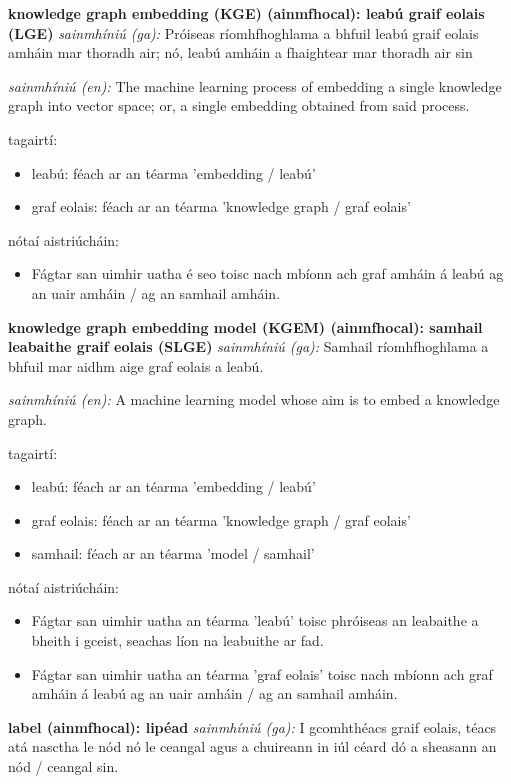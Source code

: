 \documentclass{article}
\begin{document}
\textbf{knowledge graph embedding (KGE) (ainmfhocal): leabú graif eolais (LGE)}
\textit{sainmhíniú (ga):} Próiseas ríomhfhoghlama a bhfuil leabú graif eolais amháin mar thoradh air; nó, leabú amháin a fhaightear mar thoradh air sin

\textit{sainmhíniú (en):} The machine learning process of embedding a single knowledge graph into vector space; or, a single embedding obtained from said process.

tagairtí:
\begin{itemize}
	\item leabú: féach ar an téarma 'embedding / leabú'
	\item graf eolais: féach ar an téarma 'knowledge graph / graf eolais'
\end{itemize}

nótaí aistriúcháin:
\begin{itemize}
	\item Fágtar san uimhir uatha é seo toisc nach mbíonn ach graf amháin á leabú ag an uair amháin / ag an samhail amháin.
\end{itemize}


\textbf{knowledge graph embedding model (KGEM) (ainmfhocal): samhail leabaithe graif eolais (SLGE)}
\textit{sainmhíniú (ga):} Samhail ríomhfhoghlama a bhfuil mar aidhm aige graf eolais a leabú.

\textit{sainmhíniú (en):} A machine learning model whose aim is to embed a knowledge graph.

tagairtí:
\begin{itemize}
	\item leabú: féach ar an téarma 'embedding / leabú'
	\item graf eolais: féach ar an téarma 'knowledge graph / graf eolais'
	\item samhail: féach ar an téarma 'model / samhail'
\end{itemize}

nótaí aistriúcháin:
\begin{itemize}
	\item Fágtar san uimhir uatha an téarma 'leabú' toisc phróiseas an leabaithe a bheith i gceist, seachas líon na leabuithe ar fad.
	\item Fágtar san uimhir uatha an téarma 'graf eolais' toisc nach mbíonn ach graf amháin á leabú ag an uair amháin / ag an samhail amháin.
\end{itemize}


\textbf{label (ainmfhocal): lipéad}
\textit{sainmhíniú (ga):} I gcomhthéacs graif eolais, téacs atá nasctha le nód nó le ceangal agus a chuireann in iúl céard dó a sheasann an nód / ceangal sin.
\end{document}
